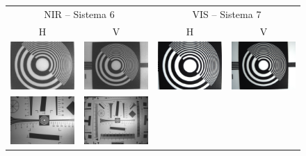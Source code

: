      \begin{figure}[H]
       \centering
       \setlength{\tabcolsep}{2pt}
       \renewcommand{\arraystretch}{0}
       \begin{tabular}{cccc}
         \multicolumn{2}{c}{\small NIR – Sistema 6} &
         \multicolumn{2}{c}{\small VIS – Sistema 7} \\
         H & V & H & V \\ 
 
         \includegraphics[width=.22\linewidth]{Figures/C4/FOV/NIR/H/7_1.png} &
         \includegraphics[width=.22\linewidth]{Figures/C4/FOV/NIR/V/8_7.png} &
         \includegraphics[width=.22\linewidth]{Figures/C4/FOV/VIS/H/9_2.png} &
         \includegraphics[width=.22\linewidth]{Figures/C4/FOV/VIS/V/10_7.png} \\
         \includegraphics[width=.22\linewidth]{Figures/C4/FOV/NIR/H/33_1.png} &
         \includegraphics[trim= 6cm 6cm 6cm 6cm, clip, width=.22\linewidth]{Figures/C4/FOV/NIR/V/65.png} & %

\end{tabular}
\end{figure}
